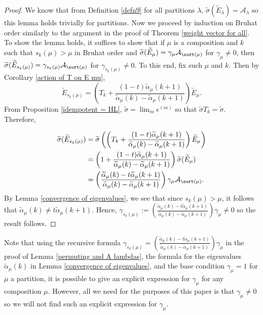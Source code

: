 \begin{proof}

We know that from Definition \ref{defn9} for all partitions $\lambda$,  $\widetilde{\sigma}( \widetilde{E}_{\lambda} ) = \mathcal{A}_{\lambda}$ so this lemma holds trivially for partitions. Now we proceed by induction on Bruhat order similarly to the argument in the proof of Theorem \ref{weight vector for all}. To show the lemma holds, it suffices to show that if $\mu$ is a composition and $k$ such that $s_k(\mu) > \mu$ in Bruhat order and $\widetilde{\sigma}( \widetilde{E}_{\mu} ) = \gamma_{\mu} \mathcal{A}_{\sort(\mu)}$ for $\gamma_{\mu} \neq 0$, then $\widetilde{\sigma}( \widetilde{E}_{s_k(\mu)} ) = \gamma_{s_k(\mu)} \mathcal{A}_{\sort(\mu)}$ for $\gamma_{s_k(\mu)} \neq 0$. To this end, fix such $\mu$ and $k$. Then by Corollary \ref{action of T on E mu},
$$\widetilde{E}_{s_k(\mu)} = \left( T_k + \frac{(1-t)\widetilde{\alpha}_{\mu}(k+1)}{\widetilde{\alpha}_{\mu}(k)- \widetilde{\alpha}_{\mu}(k+1)}\right) \widetilde{E}_{\mu}.$$
From Proposition \ref{idempotent = HL}, $\widetilde{\sigma} = \lim_{m} \epsilon^{(m)}$ so that $\widetilde{\sigma}T_k = \widetilde{\sigma}$. Therefore, 

\begin{align*}
    \widetilde{\sigma}(\widetilde{E}_{s_k(\mu)})&= \widetilde{\sigma}\left( \left( T_k + \frac{(1-t)\widetilde{\alpha}_{\mu}(k+1)}{\widetilde{\alpha}_{\mu}(k)- \widetilde{\alpha}_{\mu}(k+1)}\right) \widetilde{E}_{\mu} \right) \\
    &= \left(1+ \frac{(1-t)\widetilde{\alpha}_{\mu}(k+1)}{\widetilde{\alpha}_{\mu}(k)- \widetilde{\alpha}_{\mu}(k+1)} \right) \widetilde{\sigma}(\widetilde{E}_{\mu}) \\
    &= \left( \frac{\widetilde{\alpha}_{\mu}(k) - t \widetilde{\alpha}_{\mu}(k+1)}{\widetilde{\alpha}_{\mu}(k) - \widetilde{\alpha}_{\mu}(k+1)} \right) \gamma_{\mu} \mathcal{A}_{\sort(\mu)}.
\end{align*}
By Lemma \ref{convergence of eigenvalues}, we see that since $s_k(\mu) > \mu$, it follows that $\widetilde{\alpha}_{\mu}(k) \neq t \widetilde{\alpha}_{\mu}(k+1).$
Hence, $\gamma_{s_k(\mu)} := \left( \frac{\widetilde{\alpha}_{\mu}(k) - t \widetilde{\alpha}_{\mu}(k+1)}{\widetilde{\alpha}_{\mu}(k) - \widetilde{\alpha}_{\mu}(k+1)} \right) \gamma_{\mu} \neq 0$ so the result follows.
\end{proof}

\begin{rema}
    Note that using the recursive formula $\gamma_{s_k(\mu)} = \left( \frac{\widetilde{\alpha}_{\mu}(k) - t \widetilde{\alpha}_{\mu}(k+1)}{\widetilde{\alpha}_{\mu}(k) - \widetilde{\alpha}_{\mu}(k+1)} \right) \gamma_{\mu}$ in the proof of Lemma \ref{permuting and A lambdas}, the formula for the eigenvalues $\widetilde{\alpha}_{\mu}(k)$ in Lemma \ref{convergence of eigenvalues}, and the base condition $\gamma_{\mu} = 1$ for $\mu$ a partition, it is possible to give an explicit expression for $\gamma_{\mu}$ for any composition $\mu.$ However, all we need for the purposes of this paper is that $\gamma_{\mu} \neq 0$ so we will not find such an explicit expression for $\gamma_{\mu}.$
\end{rema}

